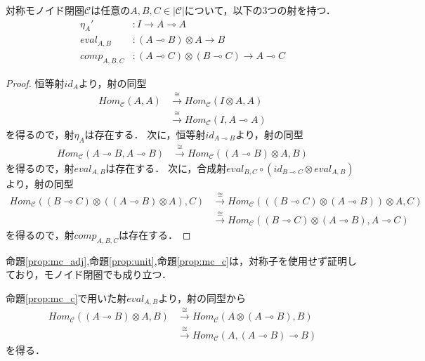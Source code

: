 \documentclass[type_judgement.tex]{subfiles}
\begin{document}
\begin{prop}
\label{prop:mc_c}
対称モノイド閉圏$\mathcal{C}$は任意の$A,B,C\in|\mathcal{C}|$について，以下の3つの射を持つ．
\begin{align*}
    \eta_{A}'    &: I \rightarrow A \multimap A \\
    eval_{A,B}   &: (A \multimap B) \otimes A \rightarrow B \\
    comp_{A,B,C} &: (A \multimap C) \otimes (B \multimap C) \rightarrow A \multimap C
\end{align*}
\end{prop}
\begin{proof}
恒等射$id_A$より，射の同型
\begin{align*}
    Hom_\mathcal{C}(A,A) &\xrightarrow{\cong} Hom_\mathcal{C}(I \otimes A, A) \\
    &\xrightarrow{\cong} Hom_\mathcal{C}(I, A \multimap A)
\end{align*}
を得るので，射$\eta_{A}$は存在する．
次に，恒等射$id_{A \multimap B}$より，射の同型
\begin{align*}
    Hom_\mathcal{C}(A \multimap B, A \multimap B) &\xrightarrow{\cong} Hom_\mathcal{C}((A \multimap B) \otimes A, B)
\end{align*}
を得るので，射$eval_{A,B}$は存在する．
次に，合成射$eval_{B,C}\circ(id_{B\multimap{}C}\otimes eval_{A,B})$より，射の同型
\begin{align*}
    Hom_\mathcal{C}((B \multimap C)\otimes((A \multimap B)\otimes A), C) &\xrightarrow{\cong} Hom_\mathcal{C}( ((B \multimap C)\otimes(A \multimap B)) \otimes A, C) \\
    &\xrightarrow{\cong} Hom_\mathcal{C}((B \multimap C) \otimes (A \multimap B), A \multimap C)
\end{align*}
を得るので，射$comp_{A,B,C}$は存在する．
\end{proof}

命題\ref{prop:mc_adj},命題\ref{prop:unit},命題\ref{prop:mc_c}は，対称子を使用せず証明しており，モノイド閉圏でも成り立つ．

命題\ref{prop:mc_c}で用いた射$eval_{A,B}$より，射の同型から
\begin{align*}
    Hom_\mathcal{C}((A\multimap B) \otimes A, B) &\xrightarrow{\cong} Hom_\mathcal{C}(A \otimes (A \multimap B), B) \\
    &\xrightarrow{\cong} Hom_\mathcal{C}(A, (A \multimap B) \multimap B)
\end{align*}
を得る．
\end{document}
